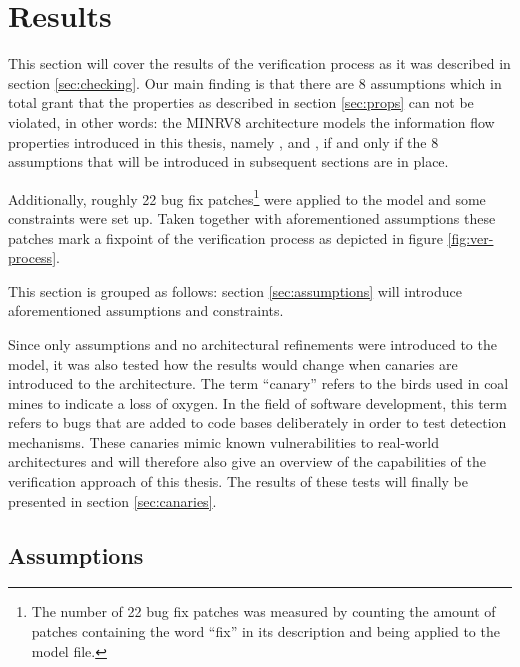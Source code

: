 
\section{Results}
\label{sec:results}

This section will cover the results of the verification process as it was described in section \ref{sec:checking}.
Our main finding is that there are 8 assumptions which in total grant that the properties as described in section \ref{sec:props} can not be violated, in other words: the MINRV8 architecture models the information flow properties introduced in this thesis, namely ,  and , if and only if the 8 assumptions that will be introduced in subsequent sections are in place.


Additionally, roughly 22 bug fix patches\footnote{%
    The number of 22 bug fix patches was measured by counting the amount of patches containing the word \enquote{fix} in its description and being applied to the model file.
} were applied to the model and some  constraints were set up.
Taken together with aforementioned assumptions these patches mark a fixpoint of the verification process as depicted in figure \ref{fig:ver-process}.

This section is grouped as follows: section \ref{sec:assumptions} will introduce aforementioned assumptions and  constraints.

Since only assumptions and no architectural refinements were introduced to the model, it was also tested how the results would change when canaries are introduced to the architecture.
The term \enquote{canary} refers to the birds used in coal mines to indicate a loss of oxygen.
In the field of software development, this term refers to bugs that are added to code bases deliberately in order to test detection mechanisms.
These canaries mimic known vulnerabilities to real-world architectures and will therefore also give an overview of the capabilities of the verification approach of this thesis.
The results of these tests will finally be presented in section \ref{sec:canaries}.

\subsection{Assumptions}

